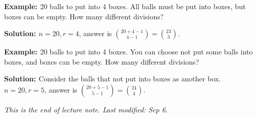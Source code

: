\documentclass[11pt, a4paper]{MATH2421}
\newcommand{\eg}{{\bf {Example: }}}
\newcommand{\sol}{{\bf {Solution: }}}
\begin{document}
\begin{spacing}{1.3}
    \eg 20 balls to put into 4 boxes. All balls must be 
    put into boxes, but boxes can be empty. How many 
    different divisions?

    \sol $n=20, r=4$, answer is ${20+4-1\choose 4-1}={23\choose 3}$.

    \eg 20 balls to put into 4 boxes. You can choose not put some 
    balls into boxes, and boxes can be empty. How many 
    different divisions?

    \sol Consider the balls that not put into boxes as another 
    box. 
    $n=20, r=5$, answer is ${20+5-1\choose 5-1}={24\choose 4}$.


    {\it This is the end of lecture note. Last modified: Sep 6.}
\end{spacing}
\end{document}
